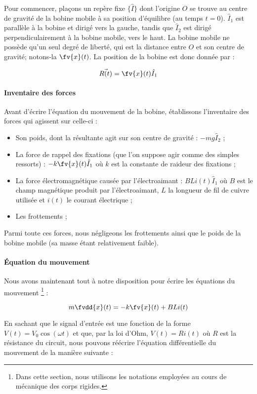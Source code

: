 Pour commencer, plaçons un repère fixe $\{\hat{I}\}$ dont l'origine $O$ se trouve
au centre de gravité de la bobine mobile à sa position d'équilibre (au
temps $t=0$). $\hat{I}_1$ est parallèle à la bobine et dirigé vers la gauche, tandis que
$\hat{I}_2$ est dirigé perpendiculairement à la bobine mobile, vers le haut.
La bobine mobile ne possède qu'un seul degré de liberté, qui
est la distance entre $O$ et son centre de gravité; notons-la $\fv{x}(t)$.
La position de la bobine est donc donnée par :

$$\vec{R(t)} = \fv{x}(t) \hat{I}_1$$

\paragraph{Inventaire des forces}
Avant d'écrire l'équation du mouvement de la bobine, établissons l'inventaire
des forces qui agissent sur celle-ci :

\begin{itemize}
\item Son poids, dont la résultante agit sur son centre de gravité : $-mg\hat{I}_2$ ;
\item La force de rappel des fixations (que l'on suppose agir comme des simples
ressorts) : $-k \fv{x}(t) \hat{I}_1$ où $k$ est la constante de raideur des fixations ;
\item La force électromagnétique causée par l'électroaimant : $BLi(t) \hat{I}_1$ où
$B$ est le champ magnétique produit par l'électroaimant, $L$ la longueur de fil de cuivre
utilisée et $i(t)$ le courant électrique ;
\item Les frottements ;
\end{itemize}
Parmi toute ces forces, nous négligeons les frottements ainsi que le poids
de la bobine mobile (sa masse étant relativement faible).
\paragraph{Équation du mouvement}
Nous avons maintenant tout à notre disposition pour écrire les équations du mouvement
\footnote{Dans cette section, nous utilisons les notations employées au cours de
mécanique des corps rigides.} :

$$m\fvdd{x}(t) = -k\fv{x}(t) + BLi(t)$$

En sachant que le signal d'entrée est une fonction de la forme $V(t) = V_0 \cos (\omega t)$ et
que, par la loi d'Ohm, $V(t) = Ri(t)$ où $R$ est la résistance du circuit,
nous pouvons réécrire l'équation différentielle du mouvement de la manière suivante :

